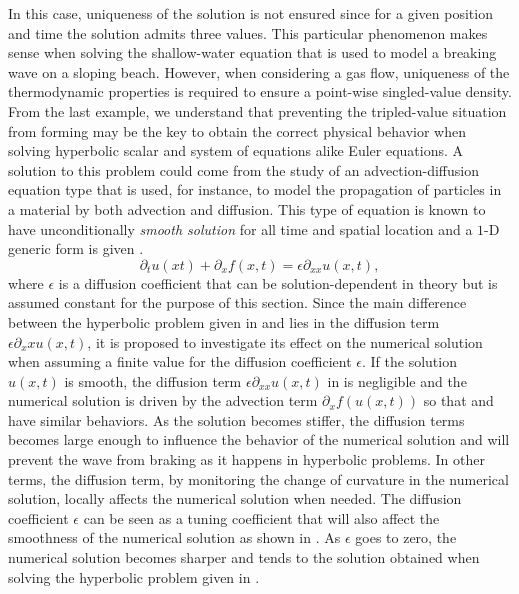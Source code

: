 %
In this case, uniqueness of the solution is not ensured since for a given position and time the solution admits three values. This particular phenomenon makes sense when solving the shallow-water equation that is used to model a breaking wave on a sloping beach. However, when considering a gas flow, uniqueness of the thermodynamic properties is required to ensure a point-wise singled-value density. From the last example, we understand that preventing the tripled-value situation from forming may be the key to obtain the correct physical behavior when solving hyperbolic scalar and system of equations alike Euler equations. A solution to this problem could come from the study of an advection-diffusion equation type that is used, for instance, to model the propagation of particles in a material by both advection and diffusion. This type of equation is known to have unconditionally \emph{smooth solution} for all time and spatial location and a $1$-D generic form is given .
%
\begin{equation}\label{eq:adv_diff_sct1b}
\partial_t u(xt) + \partial_x f(x,t) = \epsilon \partial_{xx} u(x,t),
\end{equation}
% 
where $\epsilon$ is a diffusion coefficient that can be solution-dependent in theory but is assumed constant for the purpose of this section. Since the main difference between the hyperbolic problem given in  and  lies in the diffusion term $\epsilon \partial_xx u(x,t)$, it is proposed to investigate its effect on the numerical solution when assuming a finite value for the diffusion coefficient $\epsilon$. If the solution $u(x,t)$ is smooth, the diffusion term $\epsilon \partial_{xx} u(x,t)$ in  is negligible and the numerical solution is driven by the advection term $\partial_x f(u(x,t))$ so that  and  have similar behaviors. As the solution becomes stiffer, the diffusion terms becomes large enough to influence the behavior of the numerical solution and will prevent the wave from braking as it happens in hyperbolic problems. In other terms, the diffusion term, by monitoring the change of curvature in the numerical solution, locally affects the numerical solution when needed. The diffusion coefficient $\epsilon$ can be seen as a tuning coefficient that will also affect the smoothness of the numerical solution as shown in . As $\epsilon$ goes to zero, the numerical solution becomes sharper and tends to the solution obtained when solving the hyperbolic problem given in . 
